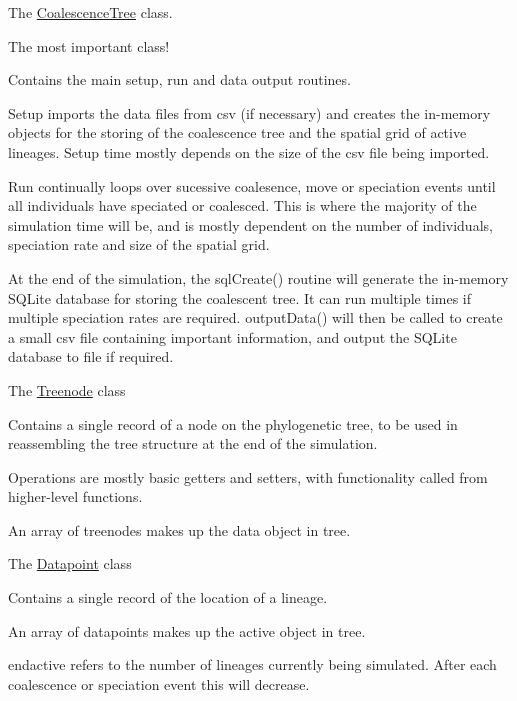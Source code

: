 \begin{DoxyItemize}
\item The {\ttfamily \hyperlink{class_tree}{CoalescenceTree}} class.
\begin{DoxyItemize}
\item The most important class!
\item Contains the main setup, run and data output routines.
\item Setup imports the data files from csv (if necessary) and creates the in-\/memory objects for the storing of the coalescence tree and the spatial grid of active lineages. Setup time mostly depends on the size of the csv file being imported.
\item Run continually loops over sucessive coalesence, move or speciation events until all individuals have speciated or coalesced. This is where the majority of the simulation time will be, and is mostly dependent on the number of individuals, speciation rate and size of the spatial grid.
\item At the end of the simulation, the sql\+Create() routine will generate the in-\/memory S\+Q\+Lite database for storing the coalescent tree. It can run multiple times if multiple speciation rates are required. output\+Data() will then be called to create a small csv file containing important information, and output the S\+Q\+Lite database to file if required.
\end{DoxyItemize}
\item The {\ttfamily \hyperlink{class_treenode}{Treenode}} class
\begin{DoxyItemize}
\item Contains a single record of a node on the phylogenetic tree, to be used in reassembling the tree structure at the end of the simulation.
\item Operations are mostly basic getters and setters, with functionality called from higher-\/level functions.
\item An array of treenodes makes up the {\ttfamily data} object in {\ttfamily tree}.
\end{DoxyItemize}
\item The {\ttfamily \hyperlink{class_datapoint}{Datapoint}} class
\begin{DoxyItemize}
\item Contains a single record of the location of a lineage.
\item An array of datapoints makes up the {\ttfamily active} object in {\ttfamily tree}.
\item {\ttfamily endactive} refers to the number of lineages currently being simulated. After each coalescence or speciation event this will decrease.

\end{DoxyItemize}
\end{DoxyItemize}
